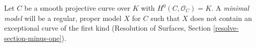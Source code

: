 \begin{definition}
\label{definition-minimal-model}
Let $C$ be a smooth projective curve over $K$ with
$H^0(C, \mathcal{O}_C) = K$. A {\it minimal model}
will be a regular, proper model $X$ for $C$ such that
$X$ does not contain an exceptional curve of the first kind
(Resolution of Surfaces, Section \ref{resolve-section-minus-one}).
\end{definition}
